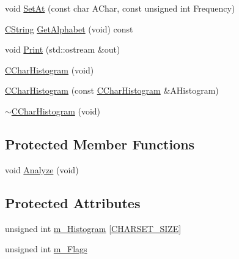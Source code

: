 \begin{DoxyCompactItemize}
\item 
void \hyperlink{classCCharHistogram_af400c54dbe885f88bc573571c983ebf9}{Set\-At} (const char A\-Char, const unsigned int Frequency)
\item 
\hyperlink{classCString}{C\-String} \hyperlink{classCCharHistogram_a4e859ca770e32c17e7a095497b79010f}{Get\-Alphabet} (void) const 
\item 
void \hyperlink{classCCharHistogram_a9bb45898311556d8e8a1e2d440d26169}{Print} (std\-::ostream \&out)
\item 
\hyperlink{classCCharHistogram_a02f89ee29030c141374a0f9fbec65351}{C\-Char\-Histogram} (void)
\item 
\hyperlink{classCCharHistogram_a3610e2cb0baacc09dc0f9fa50cfc43cc}{C\-Char\-Histogram} (const \hyperlink{classCCharHistogram}{C\-Char\-Histogram} \&A\-Histogram)
\item 
\hyperlink{classCCharHistogram_aa33ebe08c1f21feaec5d183ae80599ca}{$\sim$\-C\-Char\-Histogram} (void)
\end{DoxyCompactItemize}
\subsection*{Protected Member Functions}
\begin{DoxyCompactItemize}
\item 
void \hyperlink{classCCharHistogram_aae4f899a4a1b4bf64d3bf9d01fdd6211}{Analyze} (void)
\end{DoxyCompactItemize}
\subsection*{Protected Attributes}
\begin{DoxyCompactItemize}
\item 
unsigned int \hyperlink{classCCharHistogram_a76d704b2eb9941abfe14acd56b064543}{m\-\_\-\-Histogram} \mbox{[}\hyperlink{stlstrings_8h_a8085b77b952d20d37d96fff6a294be34}{C\-H\-A\-R\-S\-E\-T\-\_\-\-S\-I\-Z\-E}\mbox{]}
\item 
unsigned int \hyperlink{classCCharHistogram_a043e57dff1e0d698e3a9c6b39a1c69ba}{m\-\_\-\-Flags}
\end{DoxyCompactItemize}
